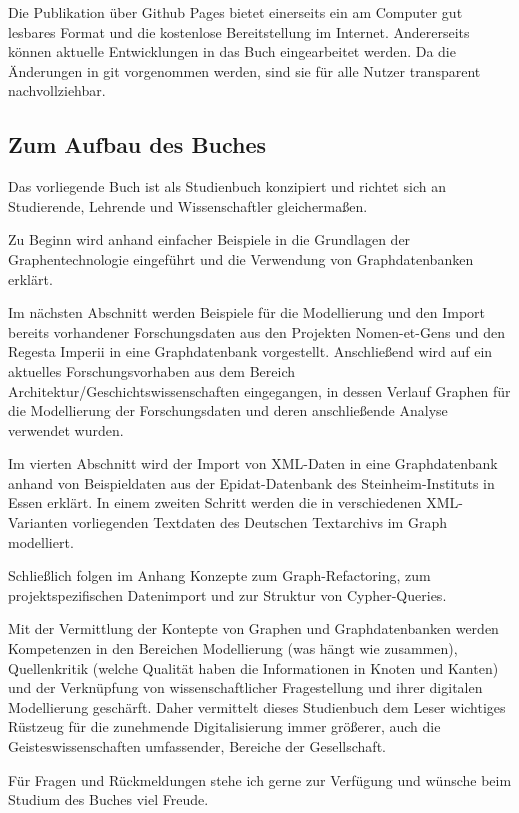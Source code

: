 Die Publikation über Github Pages bietet einerseits ein am Computer gut
lesbares Format und die kostenlose Bereitstellung im Internet.
Andererseits können aktuelle Entwicklungen in das Buch eingearbeitet
werden. Da die Änderungen in git vorgenommen werden, sind sie für alle
Nutzer transparent nachvollziehbar.

\hypertarget{zum-aufbau-des-buches}{%
\subsection{Zum Aufbau des Buches}\label{zum-aufbau-des-buches}}

Das vorliegende Buch ist als Studienbuch konzipiert und richtet sich an
Studierende, Lehrende und Wissenschaftler gleichermaßen.

Zu Beginn wird anhand einfacher Beispiele in die Grundlagen der
Graphentechnologie eingeführt und die Verwendung von Graphdatenbanken
erklärt.

Im nächsten Abschnitt werden Beispiele für die Modellierung und den
Import bereits vorhandener Forschungsdaten aus den Projekten
Nomen-et-Gens und den Regesta Imperii in eine Graphdatenbank
vorgestellt. Anschließend wird auf ein aktuelles Forschungsvorhaben aus
dem Bereich Architektur/Geschichtswissenschaften eingegangen, in dessen
Verlauf Graphen für die Modellierung der Forschungsdaten und deren
anschließende Analyse verwendet wurden.

Im vierten Abschnitt wird der Import von XML-Daten in eine
Graphdatenbank anhand von Beispieldaten aus der Epidat-Datenbank des
Steinheim-Instituts in Essen erklärt. In einem zweiten Schritt werden
die in verschiedenen XML-Varianten vorliegenden Textdaten des Deutschen
Textarchivs im Graph modelliert.

Schließlich folgen im Anhang Konzepte zum Graph-Refactoring, zum
projektspezifischen Datenimport und zur Struktur von Cypher-Queries.

Mit der Vermittlung der Kontepte von Graphen und Graphdatenbanken werden
Kompetenzen in den Bereichen Modellierung (was hängt wie zusammen),
Quellenkritik (welche Qualität haben die Informationen in Knoten und
Kanten) und der Verknüpfung von wissenschaftlicher Fragestellung und
ihrer digitalen Modellierung geschärft. Daher vermittelt dieses
Studienbuch dem Leser wichtiges Rüstzeug für die zunehmende
Digitalisierung immer größerer, auch die Geisteswissenschaften
umfassender, Bereiche der Gesellschaft.

Für Fragen und Rückmeldungen stehe ich gerne zur Verfügung und wünsche
beim Studium des Buches viel Freude.

